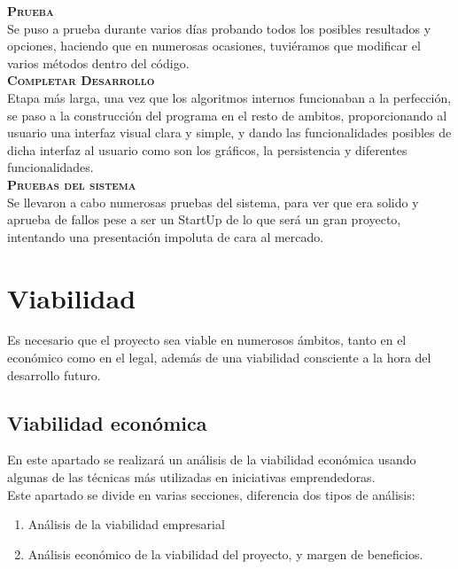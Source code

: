\textbf{\textsc{Prueba}}\\
Se puso a prueba durante varios días probando todos los posibles resultados y opciones, haciendo que en numerosas ocasiones, tuviéramos que modificar el varios métodos dentro del código.\\

\textbf{\textsc{Completar Desarrollo}}\\
Etapa más larga, una vez que los algoritmos internos funcionaban a la perfección, se paso a la construcción del programa en el resto de ambitos, proporcionando al usuario una interfaz visual clara y simple, y dando las funcionalidades posibles de dicha interfaz al usuario como son los gráficos, la persistencia y diferentes funcionalidades.\\

\textbf{\textsc{Pruebas del sistema }}\\
Se llevaron a cabo numerosas pruebas del sistema, para ver que era solido y aprueba de fallos pese a ser un StartUp de lo que será un gran proyecto, intentando una presentación impoluta de cara al mercado.
\section{Viabilidad}
Es necesario que el proyecto sea viable en numerosos ámbitos, tanto en el económico como en el legal, además de una viabilidad consciente a la hora del desarrollo futuro.
\subsection{Viabilidad económica}
En este apartado se realizará un análisis de la viabilidad económica usando algunas de las técnicas más utilizadas en iniciativas emprendedoras.\\
Este apartado se divide en varias secciones, diferencia dos tipos de análisis:
\begin{enumerate}
\item Análisis  de la viabilidad empresarial
\item Análisis económico de la viabilidad del proyecto, y margen de beneficios.
\end{enumerate}

